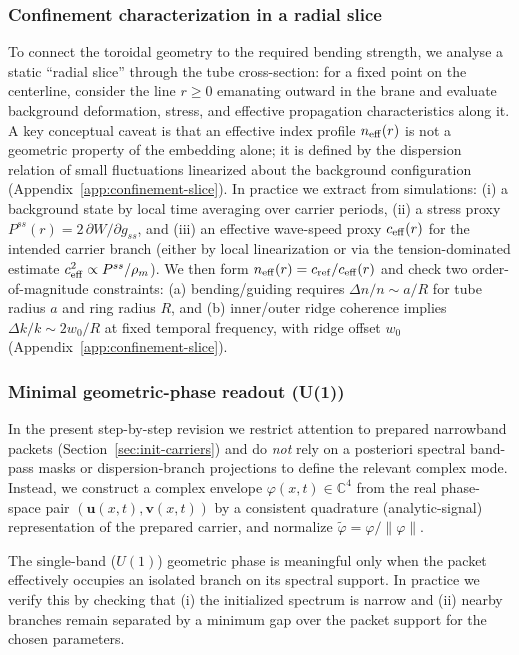 \subsubsection{Confinement characterization in a radial slice}
To connect the toroidal geometry to the required bending strength, we analyse a static ``radial slice''
through the tube cross-section: for a fixed point on the centerline, consider the line $r\ge 0$
emanating outward in the brane and evaluate background deformation, stress, and effective propagation
characteristics along it.
A key conceptual caveat is that an effective index profile $n_{\rm eff}(r)$ is not a geometric
property of the embedding alone; it is defined by the dispersion relation of small fluctuations
linearized about the background configuration (Appendix~\ref{app:confinement-slice}).
In practice we extract from simulations:
(i) a background state by local time averaging over carrier periods,
(ii) a stress proxy $P^{ss}(r)=2\,\partial W/\partial g_{ss}$, and
(iii) an effective wave-speed proxy $c_{\rm eff}(r)$ for the intended carrier branch (either by local
linearization or via the tension-dominated estimate $c_{\rm eff}^2\propto P^{ss}/\rho_m$).
We then form $n_{\rm eff}(r)=c_{\rm ref}/c_{\rm eff}(r)$ and check two order-of-magnitude constraints:
(a) bending/guiding requires $\Delta n/n\sim a/R$ for tube radius $a$ and ring radius $R$, and
(b) inner/outer ridge coherence implies $\Delta k/k\sim 2w_0/R$ at fixed temporal frequency, with
ridge offset $w_0$ (Appendix~\ref{app:confinement-slice}).

\subsubsection{Minimal geometric-phase readout (U(1))}
In the present step-by-step revision we restrict attention to prepared narrowband packets
(Section~\ref{sec:init-carriers}) and do \emph{not} rely on a posteriori spectral band-pass masks
or dispersion-branch projections to define the relevant complex mode.
Instead, we construct a complex envelope $\varphi(x,t)\in\mathbb C^4$ from the real phase-space pair
$(\mathbf u(x,t),\mathbf v(x,t))$ by a consistent quadrature (analytic-signal) representation
of the prepared carrier, and normalize $\tilde \varphi=\varphi/\|\varphi\|$.

The single-band ($U(1)$) geometric phase is meaningful only when the packet effectively occupies
an isolated branch on its spectral support. In practice we verify this by checking that (i) the
initialized spectrum is narrow and (ii) nearby branches remain separated by a minimum gap over the
packet support for the chosen parameters.

